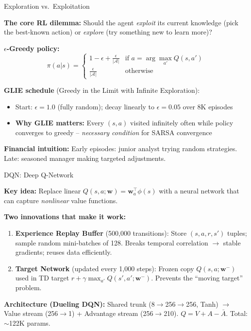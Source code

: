 \documentclass[aspectratio=169, 11pt]{beamer}
\begin{document}
\begin{frame}{Exploration vs.\ Exploitation}

\textbf{The core RL dilemma:} Should the agent \textit{exploit} its current knowledge (pick the best-known action) or \textit{explore} (try something new to learn more)?

\vspace{0.2em}
\textbf{$\epsilon$-Greedy policy:}
\[
\pi(a|s) = \begin{cases}
1 - \epsilon + \frac{\epsilon}{|\mathcal{A}|} & \text{if } a = \arg\max_{a'} Q(s, a') \\[0.3em]
\frac{\epsilon}{|\mathcal{A}|} & \text{otherwise}
\end{cases}
\]

\vspace{0.2em}
\textbf{GLIE schedule} (Greedy in the Limit with Infinite Exploration):
\begin{itemize}
    \item Start: $\epsilon = 1.0$ (fully random); decay linearly to $\epsilon = 0.05$ over 8K episodes
    \item \textbf{Why GLIE matters:} Every $(s,a)$ visited infinitely often while policy converges to greedy -- \textit{necessary condition} for SARSA convergence
\end{itemize}

\vspace{0.2em}
\textbf{Financial intuition:} Early episodes: junior analyst trying random strategies. Late: seasoned manager making targeted adjustments.
\end{frame}
\begin{frame}{DQN: Deep Q-Network}

\textbf{Key idea:} Replace linear $Q(s,a;\mathbf{w}) = \mathbf{w}_a^\top\phi(s)$ with a neural network that can capture \textit{nonlinear} value functions.

\vspace{0.3em}
\textbf{Two innovations that make it work:}
\begin{enumerate}
    \item \textbf{Experience Replay Buffer} (500,000 transitions): Store $(s, a, r, s')$ tuples; sample random mini-batches of 128. Breaks temporal correlation $\to$ stable gradients; reuses data efficiently.

    \item \textbf{Target Network} (updated every 1,000 steps): Frozen copy $Q(s,a;\mathbf{w}^-)$ used in TD target $r + \gamma \max_{a'} Q(s', a'; \mathbf{w}^-)$. Prevents the ``moving target'' problem.
\end{enumerate}

\vspace{0.2em}
\textbf{Architecture (Dueling DQN):} Shared trunk (8$\to$256$\to$256, Tanh) $\to$ Value stream (256$\to$1) + Advantage stream (256$\to$210). $Q = V + A - \bar{A}$. Total: $\sim$122K params.
\end{frame}
\end{document}
